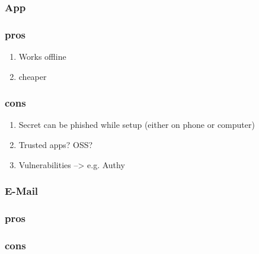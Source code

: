 \subsubsection{App}

\subsubsection{pros}

\begin{enumerate}
	\item Works offline
	\item cheaper
\end{enumerate}

\subsubsection{cons}

\begin{enumerate}
	\item Secret can be phished while setup (either on phone or computer)
	\item Trusted apps? OSS?
	\item Vulnerabilities --> e.g. Authy
\end{enumerate}

\subsubsection{E-Mail}

\subsubsection{pros}

\subsubsection{cons}
